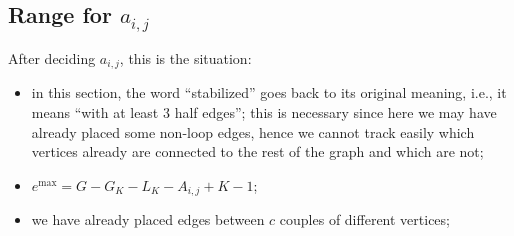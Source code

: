 \documentclass{amsart}
\theoremstyle{plain}
\theoremstyle{definition}
\DeclareMathOperator{\MAX}{max}
\begin{document}
\subsection{Range for $a_{i,j}$}

After deciding $a_{i,j}$, this is the situation:
\begin{itemize}
\item in this section, the word ``stabilized'' goes back to its
  original meaning, i.e., it means ``with at least $3$ half edges'';
  this is necessary since here we may have already placed some
  non-loop edges, hence we cannot track easily which vertices already
  are connected to the rest of the graph and which are not;
\item $e^{\MAX} = G - G_K - L_K - A_{i,j} + K - 1$;
\item we have already placed edges between $c$ couples of different
  vertices;
\end{itemize}
\end{document}
